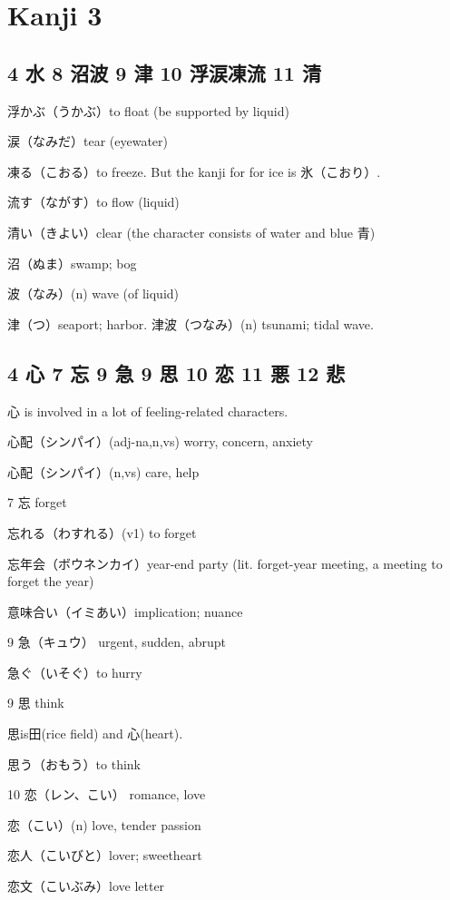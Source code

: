 \chapter{Kanji 3}

\section{4 水 8 沼波 9 津 10 浮涙凍流 11 清}

浮かぶ（うかぶ）to float (be supported by liquid)

涙（なみだ）tear (eyewater)

凍る（こおる）to freeze.
But the kanji for for ice is 氷（こおり）.

流す（ながす）to flow (liquid)

清い（きよい）clear (the character consists of water and blue 青)

沼（ぬま）swamp; bog

波（なみ）(n) wave (of liquid)

津（つ）seaport; harbor.
津波（つなみ）(n) tsunami; tidal wave.

\section{4 心 7 忘 9 急 9 思 10 恋 11 悪 12 悲}

心 is involved in a lot of feeling-related characters.

心配（シンパイ）(adj-na,n,vs) worry, concern, anxiety

心配（シンパイ）(n,vs) care, help

7 忘 forget

忘れる（わすれる）(v1) to forget

忘年会（ボウネンカイ）year-end party (lit. forget-year meeting, a meeting to forget the year)

意味合い（イミあい）implication; nuance

9 急（キュウ） urgent, sudden, abrupt

急ぐ（いそぐ）to hurry

9 思 think

思is田(rice field) and 心(heart).

思う（おもう）to think

10 恋（レン、こい） romance, love

恋（こい）(n) love, tender passion

恋人（こいびと）lover; sweetheart

恋文（こいぶみ）love letter

